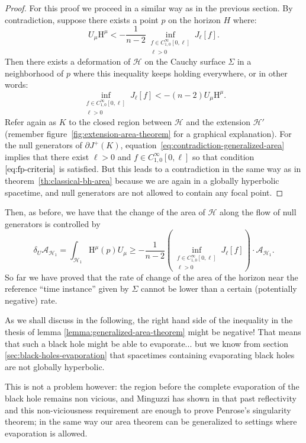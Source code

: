 \begin{proof}
	For this proof we proceed in a similar way as in the previous section. By contradiction, suppose there exists a point \(p\) on the horizon \(H\) where:
	\[
		U_{\mu}\mathrm{H}^{\mu} < -\frac{1}{n - 2} \inf_{\substack{f\in C^{\infty}_{1,0}[0, \ell]\\ \ell > 0}}J_{\ell}[f].
	\]
	Then there exists a deformation of \(\mathscr{H}\) on the Cauchy surface \(\Sigma\) in a neighborhood of \(p\) where this inequality keeps holding everywhere, or in other words:
	\begin{equation}
		\label{eq:contradiction-generalized-area}
		\inf_{\substack{f\in C^{\infty}_{1,0}[0, \ell]\\ \ell > 0}}J_{\ell}[f] < - (n - 2)U_{\mu}\mathrm{H}^{\mu}.
	\end{equation}
	Refer again as \(K\) to the closed region between \(\mathscr{H}\) and the extension \(\mathscr{H}'\) (remember figure~\ref{fig:extension-area-theorem} for a graphical explanation).
	For the null generators of \(\partial J^+(K)\), equation~\eqref{eq:contradiction-generalized-area} implies that there exist \(\ell > 0\) and \(f\in C^{\infty}_{1,0}[0, \ell]\) so that condition~\(\eqref{eq:fp-criteria}\) is satisfied. But this leads to a contradiction in the same way as in theorem~\ref{th:classical-bh-area} because we are again in a globally hyperbolic spacetime, and null generators are not allowed to contain any focal point.

\end{proof}

Then, as before, we have that the change of the area of \(\mathscr{H}\) along the flow of null generators is controlled by
	\begin{equation*}
		\delta_U\mathcal{A}_{\mathscr{H}_1} = \int_{\mathscr{H}_1} \mathrm{H}^{\mu}(p)U_{\mu} \ge - \frac{1}{n - 2}\left(\inf_{\substack{f\in C^{\infty}_{1,0}[0, \ell]\\ \ell > 0}}J_{\ell}[f]\right)\cdot\mathcal{A}_{\mathscr{H}_1}.
	\end{equation*}
	So far we have proved that the rate of change of the area of the horizon near the reference ``time instance'' given by \(\Sigma\) cannot be lower than a certain (potentially negative) rate. 
	
\begin{remark}
	As we shall discuss in the following, the right hand side of the inequality in the thesis of lemma \ref{lemma:generalized-area-theorem} might be negative! That means that such a black hole might be able to evaporate... but we know from section \ref{sec:black-holes-evaporation} that spacetimes containing evaporating black holes are not globally hyperbolic.

	This is not a problem however: the region before the complete evaporation of the black hole remains non vicious, and Minguzzi has shown in \cite[]{minguzzi2020gravitational} that past reflectivity and this non-viciousness requirement are enough to prove Penrose's singularity theorem; in the same way our area theorem can be generalized to settings where evaporation is allowed.
\end{remark}

